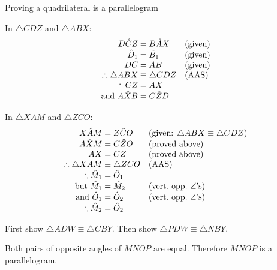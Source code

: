 \begin{wex}{Proving a quadrilateral is a parallelogram}
{  
  In $\triangle CDZ$ and $\triangle ABX$:
  \begin{equation*}
    \begin{array}{r@{\;}l@{\quad}l}
      D\hat{C}Z &= B\hat{A}X & \mbox{(given)} \\
      \hat{D}_{1} &= \hat{B}_{1} & \mbox{(given)} \\
      DC &= AB & \mbox{(given)}\\
      \therefore \triangle ABX &\equiv \triangle CDZ & \mbox{(AAS)} \\ 
      \therefore CZ &= AX & \\
      \mbox{and } A\hat{X}B &= C\hat{Z}D &
    \end{array}
  \end{equation*}

  In $\triangle XAM$ and $\triangle ZCO$:
  \begin{equation*}
    \begin{array}{r@{\;}l@{\quad}l}
      X\hat{A}M &= Z\hat{C}O & \mbox{(given: $\triangle ABX \equiv \triangle CDZ$)} \\
      A\hat{X}M &= C\hat{Z}O & \mbox{(proved above)} \\
      AX &= CZ & \mbox{(proved above)} \\
      \therefore \triangle XAM &\equiv \triangle ZCO & \mbox{(AAS)} \\
      \therefore  \hat{M}_{1}&=  \hat{O}_{1}& \\
      \mbox{but } \hat{M}_1 &= \hat{M}_2 & \mbox{(vert.\ opp.\ $\angle$'s)} \\
      \mbox{and } \hat{O}_{1} &= \hat{O}_2 & \mbox{(vert.\ opp.\ $\angle$'s)} \\
      \therefore \hat{M}_2 &= \hat{O}_{2} &
    \end{array}
  \end{equation*}

  First show $\triangle ADW \equiv \triangle CBY$. Then show $\triangle
  PDW \equiv \triangle NBY$.

  Both pairs of opposite angles of $MNOP$ are equal. Therefore $MNOP$ is
  a parallelogram.
}
\end{wex}


